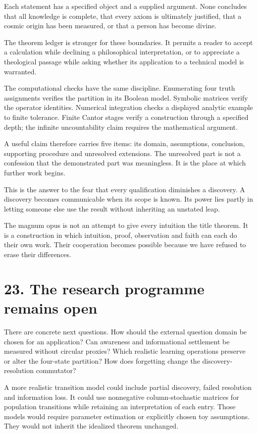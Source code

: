 \documentclass[10pt]{article}
\begin{document}
Each statement has a specified object and a supplied argument. None concludes that all knowledge is complete, that every axiom is ultimately justified, that a cosmic origin has been measured, or that a person has become divine.

The theorem ledger is stronger for these boundaries. It permits a reader to accept a calculation while declining a philosophical interpretation, or to appreciate a theological passage while asking whether its application to a technical model is warranted.

The computational checks have the same discipline. Enumerating four truth assignments verifies the partition in its Boolean model. Symbolic matrices verify the operator identities. Numerical integration checks a displayed analytic example to finite tolerance. Finite Cantor stages verify a construction through a specified depth; the infinite uncountability claim requires the mathematical argument.

A useful claim therefore carries five items: its domain, assumptions, conclusion, supporting procedure and unresolved extensions. The unresolved part is not a confession that the demonstrated part was meaningless. It is the place at which further work begins.

This is the answer to the fear that every qualification diminishes a discovery. A discovery becomes communicable when its scope is known. Its power lies partly in letting someone else use the result without inheriting an unstated leap.

The magnum opus is not an attempt to give every intuition the title theorem. It is a construction in which intuition, proof, observation and faith can each do their own work. Their cooperation becomes possible because we have refused to erase their differences.

\clearpage
\section*{23. The research programme remains open}
There are concrete next questions. How should the external question domain be chosen for an application? Can awareness and informational settlement be measured without circular proxies? Which realistic learning operations preserve or alter the four-state partition? How does forgetting change the discovery-resolution commutator?

A more realistic transition model could include partial discovery, failed resolution and information loss. It could use nonnegative column-stochastic matrices for population transitions while retaining an interpretation of each entry. Those models would require parameter estimation or explicitly chosen toy assumptions. They would not inherit the idealized theorem unchanged.
\end{document}
